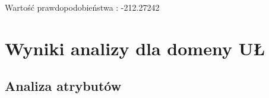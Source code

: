 \documentclass{classrep}
\begin{document}
\begin{itemize}
    \begin{table}[H]
    \centering
    \caption{Wynik analizy klastrowej dla przypadku 7.}
    \label{tab:apriori_num_params}
    \end{table}
    Wartość prawdopodobieństwa : -212.27242

    \end{itemize}

    
\newpage
\section{Wyniki analizy dla domeny UŁ }
    \subsection{Analiza atrybutów}
    \renewcommand{\labelitemi}{$\blacksquare$}
    
\end{document}
